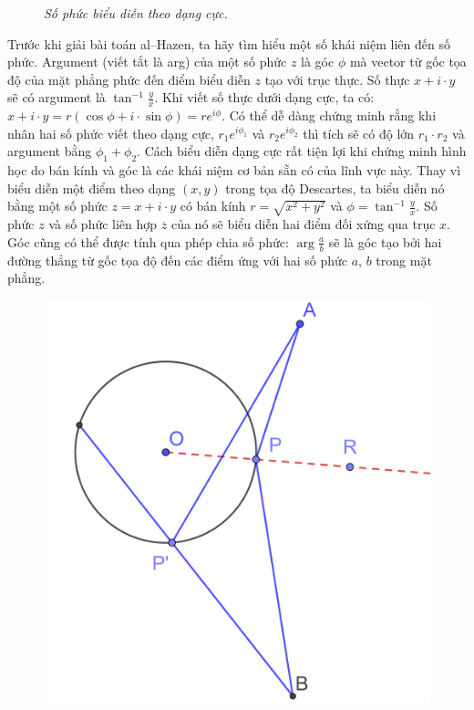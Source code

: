 \begin{multicols}{2}
\begin{figure}[H]
		\caption{\small\textit{\color{lichsutoanhoc}Số phức biểu diễn theo dạng cực.}}
		\vspace*{-10pt}
	\end{figure}
	Trước khi giải bài toán al--Hazen, ta hãy tìm hiểu một số khái niệm liên đến số phức. Argument (viết tắt là arg) của một số phức $z$ là góc $\phi$ mà vector từ gốc tọa độ của mặt phẳng phức đến điểm biểu diễn $z$ tạo với trục thực. Số thực $x+i\cdot y$ sẽ có argument là $\tan^{-1}\frac{y}{x}$. Khi viết số thực dưới dạng cực, ta có: $x+i\cdot y=r(\cos\phi+i\cdot \sin\phi)=re^{i\phi}$.
	\vskip 0.1cm 
	Có thể dễ dàng chứng minh rằng khi nhân hai số phức viết theo dạng cực, $r_1 e^{i\phi_1}$ và $r_2 e^{i\phi_2}$ thì tích sẽ có độ lớn $r_1\cdot r_2$ và argument bằng $\phi_1 + \phi_2$. Cách biểu diễn dạng cực rất tiện lợi khi chứng minh hình học do bán kính và góc là các khái niệm cơ bản sẵn có của lĩnh vực này. Thay vì biểu diễn một điểm theo dạng $(x,y)$ trong tọa độ Descartes, ta biểu diễn nó bằng một số phức $z=x+i\cdot y$ có bán kính $r=\sqrt{x^2 + y^2}$ và $\phi = \tan^{-1}\frac{y}{x}$. Số phức $z$ và số phức liên hợp $\overline{z}$ của nó sẽ biểu diễn hai điểm đối xứng qua trục $x$. Góc cũng có thể được tính qua phép chia số phức: $\arg\frac{a}{b}$ sẽ là góc tạo bởi hai đường thẳng từ gốc tọa độ đến các điểm ứng với hai số phức $a$, $b$ trong mặt phẳng.
	\begin{figure}[H]
		\vspace*{-10pt}
		\centering
		\captionsetup{labelformat= empty, justification=centering}
		\includegraphics[width= 0.85\linewidth]{13}

\end{figure}
\end{multicols}
